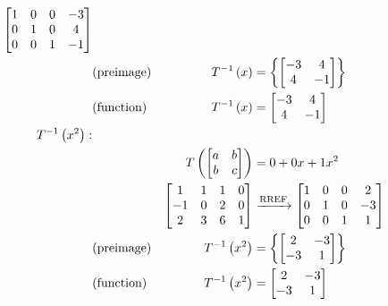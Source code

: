 \documentclass{ximera}
\begin{document}
\begin{example}
\begin{align*}
\begin{bmatrix}
1 & 0 & 0& -3 \\
0 & 1 & 0& 4 \\
0 & 0 & 1&  -1
\end{bmatrix}
\\
&\text{(preimage)}&T^{-1}\left(x\right)
&=\left\{\begin{bmatrix}-3&4\\4&-1\end{bmatrix}\right\}\\
&\text{(function)}&T^{-1}\left(x\right)
&=
\begin{bmatrix}-3&4\\4&-1\end{bmatrix}\\
T^{-1}\left(x^2\right):&\\
&&T\left(\begin{bmatrix}a&b\\b&c\end{bmatrix}\right)
&=0+0x+1x^2\\
&&\begin{bmatrix}
 1 & 1 & 1 & 0\\
 -1 & 0 & 2 & 0\\
 2 & 3 & 6 & 1
\end{bmatrix}
&\xrightarrow{\text{RREF}}
\begin{bmatrix}
1 & 0 & 0& 2 \\
0 & 1 & 0& -3 \\
0 & 0 & 1&  1
\end{bmatrix}
\\
&\text{(preimage)}&T^{-1}\left(x^2\right)
&=\left\{\begin{bmatrix}2&-3\\-3&1\end{bmatrix}\right\}\\
&\text{(function)}&T^{-1}\left(x^2\right)
&=
\begin{bmatrix}2&-3\\-3&1\end{bmatrix}
\end{align*}





\end{example}
\end{document}
